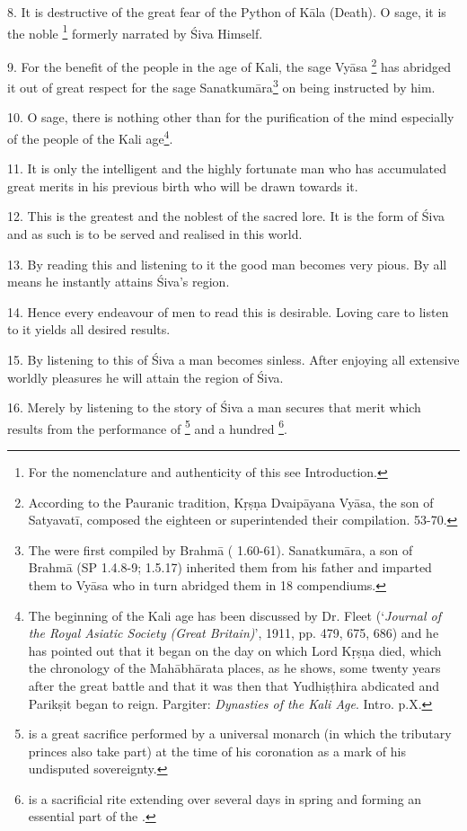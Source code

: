 8. It is destructive of the great fear of the Python of Kāla (Death). O sage,
it is the noble \footnote{For the nomenclature and authenticity
of this  see Introduction.} formerly narrated by Śiva Himself.

9. For the benefit of the people in the age of Kali, the sage Vyāsa
\footnote{According to the Pauranic tradition, Kṛṣṇa Dvaipāyana Vyāsa, the son
of Satyavatī, composed the eighteen  or superintended their
compilation.  53-70.} has abridged it out of great respect for
the sage Sanatkumāra\footnote{The  were first compiled by Brahmā
( 1.60-61). Sanatkumāra, a son of Brahmā (SP 1.4.8-9; 1.5.17)
inherited them from his father and imparted them to Vyāsa who in turn abridged
them in 18 compendiums.} on being instructed by him.

10. O sage, there is nothing other than  for the purification of
the mind especially of the people of the Kali age\footnote{The beginning of
the Kali age has been discussed by Dr. Fleet (‘\emph{Journal of the Royal
Asiatic Society (Great Britain)}’, 1911, pp. 479, 675, 686) and he has pointed
out that it began on the day on which Lord Kṛṣṇa died, which the chronology of
the Mahābhārata places, as he shows, some twenty years after the great battle
and that it was then that Yudhiṣṭhira abdicated and Parikṣit began to reign.
Pargiter: \emph{Dynasties of the Kali Age}. Intro. p.X.}.

11. It is only the intelligent and the highly fortunate man who has accumulated
great merits in his previous birth who will be drawn towards it.

12. This  is the greatest and the noblest of the sacred lore. It
is the form of Śiva and as such is to be served and realised in this world.

13. By reading this and listening to it the good man becomes very pious. By all
means he instantly attains Śiva’s region.

14. Hence every endeavour of men to read this is desirable. Loving care to
listen to it yields all desired results.

15. By listening to this  of Śiva a man becomes sinless. After
enjoying all extensive worldly pleasures he will attain the region of Śiva.

16. Merely by listening to the story of Śiva a man secures that merit which
results from the performance of \footnote{ is a great
sacrifice performed by a universal monarch (in which the tributary princes also
take part) at the time of his coronation as a mark of his undisputed
sovereignty.} and a hundred \footnote{ is a
sacrificial rite extending over several days in spring and forming an essential
part of the .}.

